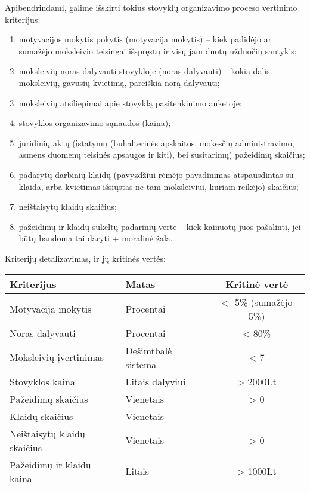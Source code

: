 Apibendrindami, galime išskirti tokius stovyklų organizavimo proceso 
vertinimo kriterijus:
\begin{enumerate}
  \item motyvacijos mokytis pokytis (motyvacija mokytis) – kiek padidėjo
    ar sumažėjo moksleivio teisingai išspręstų ir visų jam duotų užduočių
    santykis;
  \item moksleivių noras dalyvauti stovykloje (noras dalyvauti) – kokia 
    dalis moksleivių, gavusių kvietimą, pareiškia norą dalyvauti;
  \item moksleivių atsiliepimai apie stovyklą pasitenkinimo anketoje;
  \item stovyklos organizavimo sąnaudos (kaina);
  \item juridinių aktų (įstatymų (buhalterinės apskaitos,
    mokesčių administravimo, asmens duomenų teisinės apsaugos
    ir kiti), bei susitarimų) pažeidimų skaičius;
  \item padarytų darbinių klaidų (pavyzdžiui rėmėjo pavadinimas 
    atspausdintas su klaida, arba kvietimas išsiųstas ne tam moksleiviui, 
    kuriam reikėjo) skaičius;
  \item neištaisytų klaidų skaičius;
  \item pažeidimų  ir klaidų sukeltų padarinių vertė – kiek kainuotų juos 
    pašalinti, jei būtų bandoma tai daryti + moralinė žala.
\end{enumerate}

Kriterijų detalizavimas, ir jų kritinės vertės:

\begin{tabular}[]{| l | p{2.2cm} | c |}
  \hline
  Kriterijus & Matas & Kritinė vertė \\
  \hline
  Motyvacija mokytis & Procentai & < -5\% (sumažėjo 5\%) \\
  \hline
  Noras dalyvauti & Procentai & < 80\% \\
  \hline
  Moksleivių įvertinimas & Dešimtbalė sistema & < 7 \\
  \hline
  Stovyklos kaina & Litais dalyviui & > 2000Lt \\
  \hline
  Pažeidimų skaičius & Vienetais & > 0 \\
  \hline
  Klaidų skaičius & Vienetais & \\
  \hline
  Neištaisytų klaidų skaičius & Vienetais & > 0 \\
  \hline
  Pažeidimų ir klaidų kaina & Litais & > 1000Lt \\
  \hline
\end{tabular}

